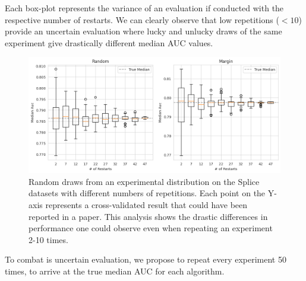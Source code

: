 \documentclass[]{article}
\begin{document}
Each box-plot represents the variance of an evaluation if conducted with the respective number of restarts.
We can clearly observe that low repetitions ($<10$) provide an uncertain evaluation where lucky and unlucky draws of the same experiment give drastically different median AUC values.
\begin{figure}
	\centering
	\includegraphics[width=\linewidth]{img/ablation_restarts.png}
	\caption{Random draws from an experimental distribution on the Splice datasets with different numbers of repetitions. Each point on the Y-axis represents a cross-validated result that could have been reported in a paper. This analysis shows the drastic differences in performance one could observe even when repeating an experiment 2-10 times.}
	\label{fig:restarts}
\end{figure}
To combat is uncertain evaluation, we propose to repeat every experiment 50 times, to arrive at the true median AUC for each algorithm.

\end{document}

